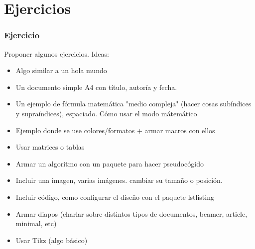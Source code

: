 \section{Ejercicios}\label{ejercicios}

\begin{frame}
\frametitle{Ejercicio}
\begin{center}

Proponer algunos ejercicios. Ideas:

\begin{itemize}
\item Algo similar a un hola mundo
\item Un documento simple A4 con título, autoría y fecha.
\item Un ejemplo de fórmula matemática "medio compleja" (hacer cosas subíndices y supraíndices), espaciado. Cómo usar el modo mátemático
\item Ejemplo donde se use colores/formatos + armar macros con ellos
\item Usar matrices o tablas
\item Armar un algoritmo con un paquete para hacer pseudocógido
\item Incluir una imagen, varias imágenes. cambiar su tamaño o posición.
\item Incluir código, como configurar el diseño con el paquete lstlisting
\item Armar diapos (charlar sobre distintos tipos de documentos, beamer, article, minimal, etc)
\item Usar Tikz (algo básico)
\end{itemize}

\end{center}
\end{frame}
